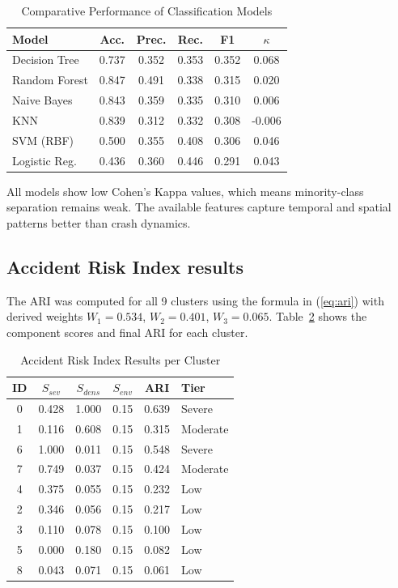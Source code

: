 \documentclass[conference]{IEEEtran}
\begin{document}
\begin{table}[htbp]
\caption{Comparative Performance of Classification Models}
\begin{center}
\footnotesize
\begin{tabular}{lccccc}
\toprule
\textbf{Model} & \textbf{Acc.} & \textbf{Prec.} & \textbf{Rec.} & \textbf{F1} & \textbf{$\kappa$} \\
\midrule
Decision Tree & 0.737 & 0.352 & 0.353 & 0.352 & 0.068 \\
Random Forest & 0.847 & 0.491 & 0.338 & 0.315 & 0.020 \\
Naive Bayes & 0.843 & 0.359 & 0.335 & 0.310 & 0.006 \\
KNN & 0.839 & 0.312 & 0.332 & 0.308 & -0.006 \\
SVM (RBF) & 0.500 & 0.355 & 0.408 & 0.306 & 0.046 \\
Logistic Reg. & 0.436 & 0.360 & 0.446 & 0.291 & 0.043 \\
\bottomrule
\end{tabular}
\label{tab:model_comparison}
\end{center}
\end{table}

All models show low Cohen's Kappa values, which means minority-class separation remains weak. The available features capture temporal and spatial patterns better than crash dynamics.

\subsection{Accident Risk Index results}

The ARI was computed for all 9 clusters using the formula in (\ref{eq:ari}) with derived weights $W_1 = 0.534$, $W_2 = 0.401$, $W_3 = 0.065$. Table~\ref{tab:ari_results} shows the component scores and final ARI for each cluster.

\begin{table}[htbp]
\caption{Accident Risk Index Results per Cluster}
\begin{center}
\footnotesize
\begin{tabular}{cccccl}
\toprule
\textbf{ID} & $S_{sev}$ & $S_{dens}$ & $S_{env}$ & \textbf{ARI} & \textbf{Tier} \\
\midrule
0 & 0.428 & 1.000 & 0.15 & 0.639 & Severe \\
1 & 0.116 & 0.608 & 0.15 & 0.315 & Moderate \\
6 & 1.000 & 0.011 & 0.15 & 0.548 & Severe \\
7 & 0.749 & 0.037 & 0.15 & 0.424 & Moderate \\
4 & 0.375 & 0.055 & 0.15 & 0.232 & Low \\
2 & 0.346 & 0.056 & 0.15 & 0.217 & Low \\
3 & 0.110 & 0.078 & 0.15 & 0.100 & Low \\
5 & 0.000 & 0.180 & 0.15 & 0.082 & Low \\
8 & 0.043 & 0.071 & 0.15 & 0.061 & Low \\
\bottomrule
\end{tabular}
\label{tab:ari_results}
\end{center}
\end{table}
\end{document}
